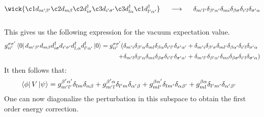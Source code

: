 \begin{equation}
\wick{
\c1 d_{m'\beta'} 
\c2 d_{m\beta} 
\c2 d_{i\sigma}^{\dagger} 
\c3 d_{i'\sigma'} 
\c3 d_{l\alpha}^{\dagger}  
\c1 d_{l'\alpha'}^{\dagger} 
}
\hspace{0.5cm}
\longrightarrow
\hspace{0.5cm}
\delta_{m'l'}
\delta_{\beta'\alpha'}
\delta_{mi}
\delta_{\beta\sigma}
\delta_{i'l}
\delta_{\sigma'\alpha}
\end{equation}
\vspace{0.5cm}\\
This gives us the following expression for the vacuum expectation value.
\begin{align}
    g_{ii'}^{\sigma\sigma'}\bra{0}d_{m'\beta'}d_{m\beta}d^{\dagger}_{i\sigma}d_{i'\sigma'}d^{\dagger}_{l,\alpha}d^{\dagger}_{l'\alpha'}\ket{0} = g_{ii'}^{\sigma\sigma'}(\delta_{m'i}
    \delta_{\beta'\alpha}
    \delta_{ml}
    \delta_{\beta\alpha}
    \delta_{i'l'}
    \delta_{\sigma'\alpha'} &+ 
    \delta_{m'i}
    \delta_{\beta'\sigma}
    \delta_{ml'}
    \delta_{\beta\alpha'}
    \delta_{i'l}
    \delta_{\sigma'\alpha}\nonumber\\ 
    +\delta_{m'l}
    \delta_{\beta'\alpha}
    \delta_{mi}
    \delta_{\beta\sigma}
    \delta_{i'l'}
    \delta_{\sigma'\alpha'} &+ 
    \delta_{m'l'}
    \delta_{\beta'\alpha'}
    \delta_{mi}
    \delta_{\beta\sigma}
    \delta_{i'l}
    \delta_{\sigma'\alpha})
\end{align}
It then follows that: 
\begin{align}
    \bra{\phi}V\ket{\psi} &= g_{m'l'}^{\beta'\alpha'} \delta_{lm}\delta_{\alpha\beta} + g_{m'l}^{\beta'\alpha}\delta_{l'm}\delta_{\alpha'\beta} + g_{ml'}^{\beta\alpha'}\delta_{lm'}\delta_{\alpha\beta'} + g_{ml}^{\beta\alpha} \delta_{l'm'}\delta_{\alpha'\beta'}
\end{align}
One can now diagonalize the perturbation in this subspace to obtain the first order energy correction.